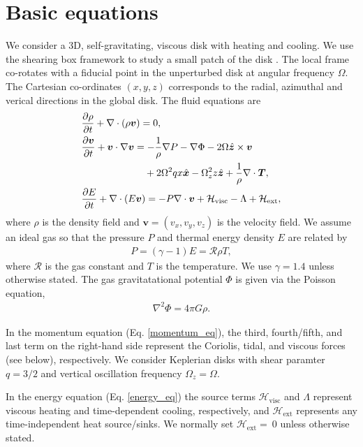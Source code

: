 \section{Basic equations}\label{basic}
We consider a 3D, self-gravitating,
viscous disk with heating and cooling. We use the shearing box framework to
study a small patch of the disk \citep{goldreich65}. The local frame
co-rotates with a fiducial point in the unperturbed disk at angular
frequency $\Omega$. The Cartesian co-ordinates $(x,y,z)$ corresponds
to the radial, azimuthal and verical directions in the global disk. 
The fluid equations are
\begin{align}
  &\frac{\p\rho}{\p t} + \nabla\cdot\left(\rho\bm{v}\right) = 0, \\
  & \frac{\p\bm{v}}{\p t} + \bm{v}\cdot\nabla\bm{v} =
  -\frac{1}{\rho}\nabla P - \nabla\Phi - 2\Omega\hat{\bm{z}}\times\bm{v}\notag\\ & 
  \phantom{\frac{\p\bm{v}}{\p t} + \bm{v}\cdot\nabla\bm{v} =}
  +2\Omega^2qx\hat{\bm{x}} -\Omega_z^2z\hat{\bm{z}} 
   + \frac{1}{\rho}\nabla\cdot\bm{T},\label{momentum_eq}\\
  & \frac{\p E}{\p t} + \nabla\cdot\left(E\bm{v}\right) = - P
  \nabla\cdot\bm{v} + \mathcal{H}_\mathrm{visc} - \Lambda +
  \mathcal{H}_\mathrm{ext} ,\label{energy_eq}
\end{align} 
where $\rho$ is the density field and $\bm{v} = (v_x, v_y, v_z)$ is
the velocity field.%
We assume an ideal gas so that the pressure $P$ and thermal energy
density $E$ are related by  
\begin{align}
  P = (\gamma-1)E = \mathcal{R}\rho T, 
\end{align}
where $\mathcal{R}$ is the gas constant and $T$ is the temperature. We
use $\gamma=1.4$ unless otherwise stated. The gas 
gravitatational potential $\Phi$ is given via the Poisson equation,  
\begin{align}
 \nabla^2\Phi = 4 \pi G \rho. 
\end{align}

In the momentum equation (Eq. \ref{momentum_eq}), the third,
fourth/fifth, and last term on the right-hand side represent the Coriolis, 
tidal, and viscous forces (see below), respectively. We consider    
Keplerian disks with shear paramter $q=3/2$ and vertical oscillation 
frequency $\Omega_z=\Omega$.  

In the energy equation (Eq. \ref{energy_eq}) the source terms 
$\mathcal{H}_\mathrm{visc}$ and $\Lambda$
represent viscous heating and time-dependent cooling, 
respectively, and $\mathcal{H}_\mathrm{ext}$ represents any
time-independent heat source/sinks. We normally set
$\mathcal{H}_\mathrm{ext}=~0$ unless otherwise stated.  

